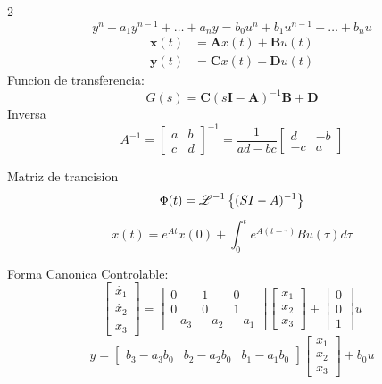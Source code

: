 \documentclass{article}
\begin{document}
\begin{multicols}{2}
  $$
  y^n+a_1y^{n-1}+\dots+a_ny=b_0u^{n}+b_1u^{n-1}+\dots+b_nu
  $$
  $$
  \begin{aligned}
    \mathbf{\dot{x}}(t) &= \mathbf{A}x(t) + \mathbf{B}u(t) \\
    \mathbf{y}(t)       &= \mathbf{C}x(t) + \mathbf{D}u(t)
  \end{aligned}
  $$
  Funcion de transferencia:
  $$
  G(s) = \mathbf{C}(s\mathbf{I}-\mathbf{A})^{-1}\mathbf{B} + \mathbf{D}
  $$
  Inversa
  $$
  A^{-1}=\begin{bmatrix}a & b \\ c & d\end{bmatrix}^{-1} = \dfrac{1}{ad-bc}\begin{bmatrix}d & -b \\ -c & a\end{bmatrix}
  $$
  \begin{itemform}
    \item Matriz de trancision
    $$
    \Phi(t) = \mathscr{L}^{-1}\left\{(SI - A)^{-1}\right\}
    $$
    $$
    x(t) = e^{At}x(0) + \int_0^t e^{A(t-\tau)}Bu(\tau)d\tau
    $$
    \item Forma Canonica Controlable:
    $$
    \begin{bmatrix}
      \dot{x_1} \\
      \dot{x_2} \\
      \dot{x_3 }
    \end{bmatrix}
    = \begin{bmatrix}
      0 & 1 & 0 \\
      0 & 0 & 1 \\
      -a_3 & -a_2 & -a_1
    \end{bmatrix}
    \begin{bmatrix}
      x_1 \\
      x_2 \\
      x_3
    \end{bmatrix}
    + \begin{bmatrix}
      0 \\
      0 \\
      1
    \end{bmatrix} u
    $$
    $$y= \begin{bmatrix}
      b_3 - a_3b_0 & b_2 - a_2b_0 & b_1 - a_1b_0
    \end{bmatrix} \begin{bmatrix}
      x_1 \\
      x_2 \\
      x_3
    \end{bmatrix}+b_0 u$$


\end{itemform}
\end{multicols}
\end{document}
